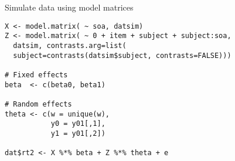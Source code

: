 \documentclass{beamer}
\begin{document}
{

\begin{frame}[fragile]{Simulate data using model matrices}
  \begin{lstlisting}
X <- model.matrix( ~ soa, datsim)
Z <- model.matrix( ~ 0 + item + subject + subject:soa,
  datsim, contrasts.arg=list(
  subject=contrasts(datsim$subject, contrasts=FALSE)))

# Fixed effects
beta  <- c(beta0, beta1)

# Random effects
theta <- c(w = unique(w),
           y0 = y01[,1],
           y1 = y01[,2])

dat$rt2 <- X %*% beta + Z %*% theta + e
  \end{lstlisting}
\end{frame}

}


% 
% 
\end{document}
